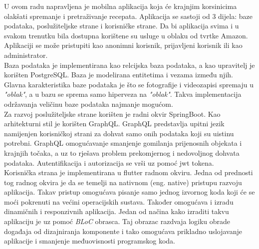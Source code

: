 \documentclass[times, utf8, zavrsni]{fer}
\begin{document}
\begin{sazetak}
      U ovom radu napravljena je mobilna aplikacija koja će krajnjim korsinicima olakšati spremanje i pretraživanje
      recepata. Aplikacija se sastoji od 3 dijela: baze podataka, poslužiteljske strane i korisničke strane.
      Da bi aplikacija svima i u svakom trenutku bila dostupna korištene su usluge u oblaku od tvrtke Amazon.
      Aplikaciji se može pristupiti kao anonimni korisnik, prijavljeni korisnik ili kao administrator.
      \\
      Baza podataka je implementirana kao relcijska baza podataka, a kao upravitelj je korišten PostgreSQL.
      Baza je modelirana entitetima i vezama između njih. Glavna karakteristika baze podataka je što se fotografije
      i videozapisi spremaju u \textit{"oblak"}, a u bazu se sprema samo hiperveza na \textit{"oblak"}. Takva implementacija
      održavanja veličinu baze podataka najmanje mogućom.
      \\
      Za razvoj poslužiteljske strane korišten je radni okvir SpringBoot. Kao arhitekturni stil je korišten GraphQL.
      GraphQL predstavlja upitni jezik namijenjen korisničkoj strani za dohvat samo onih podataka
      koji su uistinu potrebni. GraphQL omogućavanje smanjenje gomilanja prijenosnih objekata i krajnjih točaka,
      a uz to rješava problem prekomjernog i nedovoljnog dohvata podataka. Autentifikacija i autorizacija se vrši
      uz pomoć jwt tokena.
      \\
      Korisnička strana je implementirana u flutter radnom okviru. Jedna od prednosti tog radnog okvira je da se
      temelji na nativnom (eng. native) pristupu razvoju aplikacija. Takav pristup omogućava pisanje samo jednog izvornog koda koji će se moći pokrenuti
      na većini operacijskih sustava. Također omogućava i izradu dinamičnih i responzivnih aplikacija. Jedan od načina kako
      izraditi takvu aplikaciju je uz pomoć \textit{BLoC} obrasca. Taj obrazac razdvaja logiku obrade događaja od dizajniranja
      komponente i tako omogućava prikladno uslojavanje aplikacije i smanjenje međuovisnosti programskog koda.
      \newpage
\end{sazetak}
\end{document}
